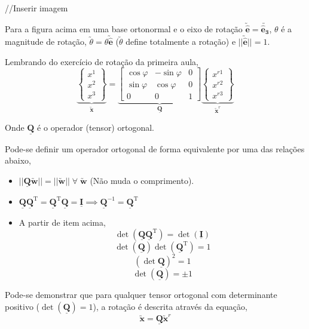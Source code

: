 	//Inserir imagem
	
	Para a figura acima em uma base ortonormal e o eixo de rotação $\utilde{\mathbf{\hat{e}}}=\utilde{\mathbf{\hat{e}_3}}$, $\theta$ é a magnitude de rotação, $\utilde{\theta}=\theta\utilde{\mathbf{\hat{e}}}$ ($\utilde{\theta}$ define totalmente a rotação) e $||\utilde{\mathbf{\hat{e}}}||=1$.
	
	Lembrando do exercício de rotação da primeira aula,
	\[
		\underbrace{\begin{Bmatrix}
			x^1 \\ x^2 \\ x^3
		\end{Bmatrix}}_{\displaystyle\utilde{\mathbf{x}}}
		=
		\underbrace{
		\begin{bmatrix}
			\cos\varphi & -\sin\varphi & 0 \\
			\sin\varphi & \cos\varphi & 0 \\
			0 & 0 & 1
		\end{bmatrix}}_{\displaystyle\underline{\mathbf{Q}}}
		\underbrace{
		\begin{Bmatrix}
			x^{r1} \\ x^{r2} \\ x^{r3}
		\end{Bmatrix}}_{\displaystyle\utilde{\mathbf{x}}^r}		
	\]
	
	Onde $\underline{\mathbf{Q}}$ é o operador (tensor) ortogonal.
	
	Pode-se definir um operador ortogonal de forma equivalente por uma das relações abaixo,
	\begin{itemize}
		\item $||\underline{\mathbf{Q}}\utilde{\mathbf{w}}||=||\utilde{\mathbf{w}}||\;\forall\;\utilde{\mathbf{w}}$ (Não muda o comprimento).
		\item $\underline{\mathbf{Q}}\underline{\mathbf{Q}}^{\text{T}}=\underline{\mathbf{Q}}^{\text{T}}\underline{\mathbf{Q}}=\underline{\mathbf{I}}\implies\underline{\mathbf{Q}}^{-1}=\underline{\mathbf{Q}}^{\text{T}}$
		\item A partir de item acima,
		\[\det(\underline{\mathbf{Q}}\underline{\mathbf{Q}}^{\text{T}})=\det(\underline{\mathbf{I}})\]
		\[\det(\underline{\mathbf{Q}})\det(\underline{\mathbf{Q}}^{\text{T}})=1\]
		\[(\det\underline{\mathbf{Q}})^2=1\]
		\[\det(\underline{\mathbf{Q}})=\pm1\]
	\end{itemize}
	
	Pode-se demonstrar que para qualquer tensor ortogonal com determinante positivo ($\det(\underline{\mathbf{Q}})=1$), a rotação é descrita através da equação,
	\[\utilde{\mathbf{x}}=\underline{\mathbf{Q}}\utilde{\mathbf{x}}^r\]
	
